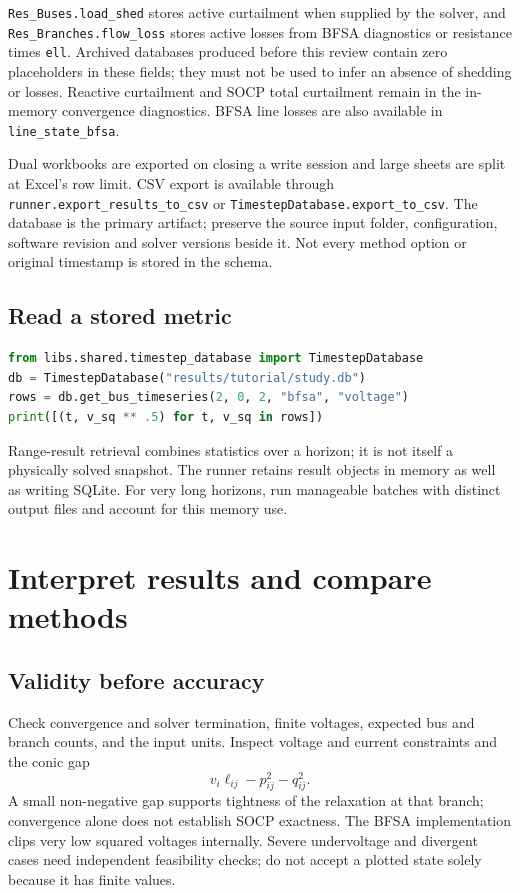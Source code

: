 \documentclass[11pt,a4paper]{article}
\newcommand{\code}[1]{\nolinkurl{#1}}
\begin{document}
\code{Res_Buses.load_shed} stores active curtailment when supplied by the
solver, and \code{Res_Branches.flow_loss} stores active losses from BFSA
diagnostics or resistance times \code{ell}. Archived databases produced before
this review contain zero placeholders in these fields; they must not be used
to infer an absence of shedding or losses. Reactive curtailment and SOCP total
curtailment remain in the in-memory convergence diagnostics. BFSA line losses
are also available in \code{line_state_bfsa}.

Dual workbooks are exported on closing a write session and large sheets are
split at Excel's row limit. CSV export is available through
\code{runner.export_results_to_csv} or \code{TimestepDatabase.export_to_csv}.
The database is the primary artifact; preserve the source input folder,
configuration, software revision and solver versions beside it. Not every
method option or original timestamp is stored in the schema.

\subsection{Read a stored metric}
\begin{lstlisting}[language=Python]
from libs.shared.timestep_database import TimestepDatabase
db = TimestepDatabase("results/tutorial/study.db")
rows = db.get_bus_timeseries(2, 0, 2, "bfsa", "voltage")
print([(t, v_sq ** .5) for t, v_sq in rows])
\end{lstlisting}
Range-result retrieval combines statistics over a horizon; it is not itself
a physically solved snapshot. The runner retains result objects in memory
as well as writing SQLite. For very long horizons, run manageable batches
with distinct output files and account for this memory use.

\section{Interpret results and compare methods}
\label{sec:results}
\subsection{Validity before accuracy}
Check convergence and solver termination, finite voltages, expected bus and
branch counts, and the input units. Inspect voltage and current constraints
and the conic gap
\[
  v_i\ell_{ij}-p_{ij}^2-q_{ij}^2.
\]
A small non-negative gap supports tightness of the relaxation at that branch;
convergence alone does not establish SOCP exactness. The BFSA implementation
clips very low squared voltages internally. Severe undervoltage and divergent
cases need independent feasibility checks; do not accept a plotted state
solely because it has finite values.
\end{document}
